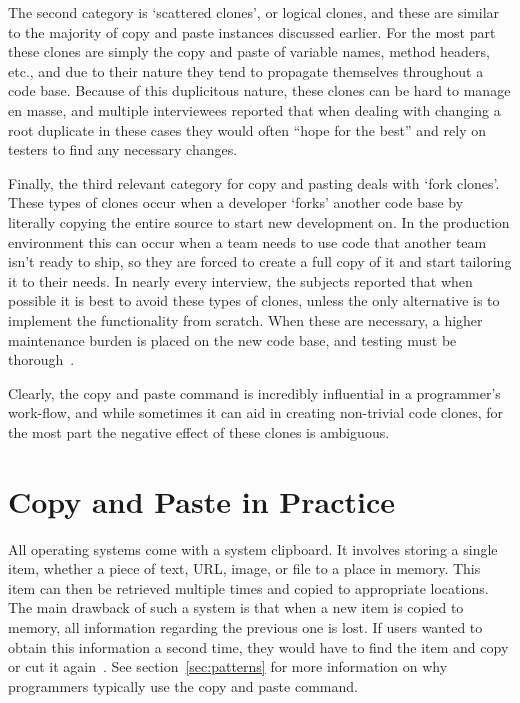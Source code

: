 \documentclass{acm_proc_article-sp}
\begin{document}
The second category is `scattered clones', or logical clones, and these are similar to the majority of copy and paste instances discussed earlier. For the most part these clones are simply the copy and paste of variable names, method headers, etc., and due to their nature they tend to propagate themselves throughout a code base. Because of this duplicitous nature, these clones can be hard to manage en masse, and multiple interviewees reported that when dealing with changing a root duplicate in these cases they would often ``hope for the best'' and rely on testers to find any  necessary changes.

Finally, the third relevant category for copy and pasting deals with `fork clones'. These types of clones occur when a developer `forks' another code base by literally copying the entire source to start new development on. In the production environment this can occur when a team needs to use code that another team isn't ready to ship, so they are forced to create a full copy of it and start tailoring it to their needs. In nearly every interview, the subjects reported that when possible it is best to avoid these types of clones, unless the only alternative is to implement the functionality from scratch. When these are necessary, a higher maintenance burden is placed on the new code base, and testing must be thorough~\cite{devWorkHabits}.

Clearly, the copy and paste command is incredibly influential in a programmer's work-flow, and while sometimes it can aid in creating non-trivial code clones, for the most part the negative effect of these clones is ambiguous. 

\section{Copy and Paste in Practice}\label{sec:copy}

All operating systems come with a system clipboard. It involves storing a single item, whether a piece of text, URL, image, or file to a place in memory. This item can then be retrieved multiple times and copied to appropriate locations. The main drawback of such a system is that when a new item is copied to memory, all information regarding the previous one is lost. If users wanted to obtain this information a second time, they would have to find the item and copy or cut it again~\cite{codeReuse}. See section~\ref{sec:patterns} for more information on why programmers typically use the copy and paste command.
\end{document}
